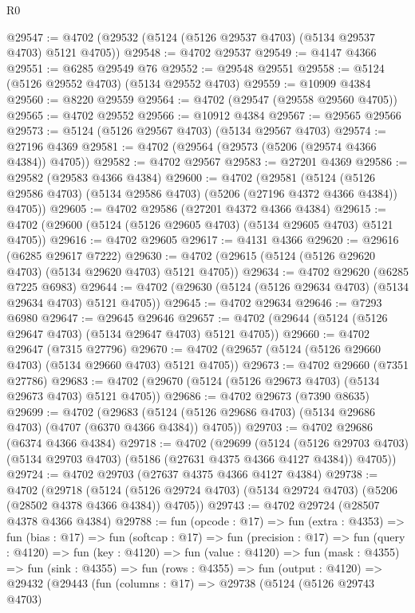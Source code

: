 \begin{lexlean}{R0}
\begin{coremodule}
@29547 := @4702 (@29532 (@5124 (@5126 @29537 @4703) (@5134 @29537 @4703) @5121 @4705))
@29548 := @4702 @29537
@29549 := @4147 @4366
@29551 := @6285 @29549 @76
@29552 := @29548 @29551
@29558 := @5124 (@5126 @29552 @4703) (@5134 @29552 @4703)
@29559 := @10909 @4384
@29560 := @8220 @29559
@29564 := @4702 (@29547 (@29558 @29560 @4705))
@29565 := @4702 @29552
@29566 := @10912 @4384
@29567 := @29565 @29566
@29573 := @5124 (@5126 @29567 @4703) (@5134 @29567 @4703)
@29574 := @27196 @4369
@29581 := @4702 (@29564 (@29573 (@5206 (@29574 @4366 @4384)) @4705))
@29582 := @4702 @29567
@29583 := @27201 @4369
@29586 := @29582 (@29583 @4366 @4384)
@29600 := @4702
    (@29581
      (@5124 (@5126 @29586 @4703) (@5134 @29586 @4703) (@5206 (@27196 @4372 @4366 @4384)) @4705))
@29605 := @4702 @29586 (@27201 @4372 @4366 @4384)
@29615 := @4702 (@29600 (@5124 (@5126 @29605 @4703) (@5134 @29605 @4703) @5121 @4705))
@29616 := @4702 @29605
@29617 := @4131 @4366
@29620 := @29616 (@6285 @29617 @7222)
@29630 := @4702 (@29615 (@5124 (@5126 @29620 @4703) (@5134 @29620 @4703) @5121 @4705))
@29634 := @4702 @29620 (@6285 @7225 @6983)
@29644 := @4702 (@29630 (@5124 (@5126 @29634 @4703) (@5134 @29634 @4703) @5121 @4705))
@29645 := @4702 @29634
@29646 := @7293 @6980
@29647 := @29645 @29646
@29657 := @4702 (@29644 (@5124 (@5126 @29647 @4703) (@5134 @29647 @4703) @5121 @4705))
@29660 := @4702 @29647 (@7315 @27796)
@29670 := @4702 (@29657 (@5124 (@5126 @29660 @4703) (@5134 @29660 @4703) @5121 @4705))
@29673 := @4702 @29660 (@7351 @27786)
@29683 := @4702 (@29670 (@5124 (@5126 @29673 @4703) (@5134 @29673 @4703) @5121 @4705))
@29686 := @4702 @29673 (@7390 @8635)
@29699 := @4702
    (@29683 (@5124 (@5126 @29686 @4703) (@5134 @29686 @4703) (@4707 (@6370 @4366 @4384)) @4705))
@29703 := @4702 @29686 (@6374 @4366 @4384)
@29718 := @4702
    (@29699
      (@5124
        (@5126 @29703 @4703)
        (@5134 @29703 @4703)
        (@5186 (@27631 @4375 @4366 @4127 @4384))
        @4705))
@29724 := @4702 @29703 (@27637 @4375 @4366 @4127 @4384)
@29738 := @4702
    (@29718
      (@5124 (@5126 @29724 @4703) (@5134 @29724 @4703) (@5206 (@28502 @4378 @4366 @4384)) @4705))
@29743 := @4702 @29724 (@28507 @4378 @4366 @4384)
@29788 := fun (opcode : @17) =>
  fun (extra : @4353) =>
  fun (bias : @17) =>
  fun (softcap : @17) =>
  fun (precision : @17) =>
  fun (query : @4120) =>
  fun (key : @4120) =>
  fun (value : @4120) =>
  fun (mask : @4355) =>
  fun (sink : @4355) =>
  fun (rows : @4355) =>
  fun (output : @4120) =>
  @29432
    (@29443
      (fun (columns : @17) =>
      @29738
        (@5124
          (@5126 @29743 @4703)

\end{coremodule}
\end{lexlean}
